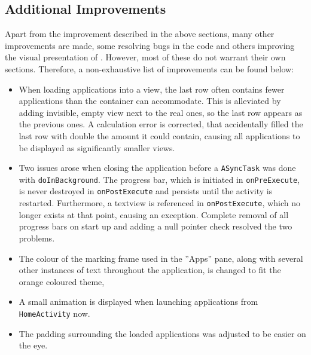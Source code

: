 \subsection{Additional Improvements}

Apart from the improvement described in the above sections, many other improvements are made, some resolving bugs in the code and others improving the visual presentation of \launcher.
However, most of these do not warrant their own sections.
Therefore, a non-exhaustive list of improvements can be found below:

\begin{itemize}
\item When loading applications into a view, the last row often contains fewer applications than the container can accommodate.
This is alleviated by adding invisible, empty view next to the real ones, so the last row appears as the previous ones.
A calculation error is corrected, that accidentally filled the last row with double the amount it could contain, causing all applications to be displayed as significantly smaller views.
\item Two issues arose when closing the application before a \lstinline|ASyncTask| was done with \lstinline|doInBackground|.
The progress bar, which is initiated in \lstinline|onPreExecute|, is never destroyed in \lstinline|onPostExecute| and persists until the activity is restarted.
Furthermore, a textview is referenced in \lstinline|onPostExecute|, which no longer exists at that point, causing an exception.
Complete removal of all progress bars on start up and adding a null pointer check resolved the two problems.
\item The colour of the marking frame used in the ''Apps'' pane, along with several other instances of text throughout the application, is changed to fit the orange coloured theme,
\item A small animation is displayed when launching applications from \lstinline|HomeActivity| now.
\item The padding surrounding the loaded applications was adjusted to be easier on the eye.
\end{itemize}